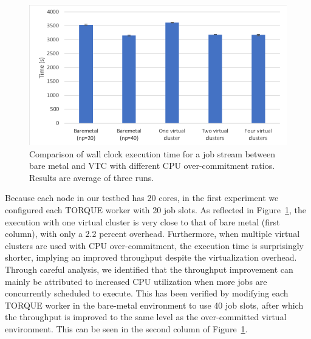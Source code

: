 \begin{figure}[!t]
   \begin{center}
       \includegraphics[width=\columnwidth]{Figures/cpu_exe_time}
   \end{center}
   \caption{Comparison of wall clock execution time for a job stream between bare metal and VTC with different CPU over-commitment ratios. Results are average of three runs.}
   \label{fig:cpu_exe_time}
 \end{figure}

Because each node in our testbed has 20 cores, in the first experiment we configured each TORQUE worker with 20 job slots. As reflected in Figure~\ref{fig:cpu_exe_time}, the execution with one virtual cluster is very close to that of bare metal (first column), with only a 2.2 percent overhead. Furthermore, when multiple virtual clusters are used with CPU over-commitment, the execution time is surprisingly shorter, implying an improved throughput despite the virtualization overhead. Through careful analysis, we identified that the throughput improvement can mainly be attributed to increased CPU utilization when more jobs are concurrently scheduled to execute. This has been verified by modifying each TORQUE worker in the bare-metal environment to use 40 job slots, after which the throughput is improved to the same level as the over-committed virtual environment. This can be seen in the second column of Figure~\ref{fig:cpu_exe_time}.

